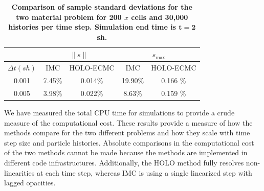 \documentclass{mc2013}
\renewcommand{\ss}{\ensuremath{\|s\|}}
\begin{document}
\begin{table}[H]
\centering
\caption{\label{twomat_var} \textbf{Comparison of sample standard deviations for the
    two material problem for 200 $x$ cells and 30,000 histories per time step.   Simulation end time is $\mathbf{t=2}$ sh.}}
\vspace{-0.1in}
\begin{tabular}{|c|cc|cc|}\cline{2-5}
    \multicolumn{1}{c|}{}       & \multicolumn{2}{|c|}{\ss} & \multicolumn{2}{|c|}{$s_{\max}$} \\ \hline
$\Delta t (sh)$   & IMC & HOLO-ECMC  &  IMC & HOLO-ECMC   \\ \hline
   0.001	      & 7.45\%  & 0.014\% &  19.90\%  & 0.166 \%            \\
   0.005          & 3.98\%  & 0.022\% &  8.63\%   & 0.159 \%     \\ \hline
\end{tabular}
\end{table}


We have measured the total CPU time for simulations to provide a crude measure of the
computational cost.  These results provide a measure of how the methods compare for
the two different problems and how they scale with
time step size and particle histories.  Absolute comparisons in the computational cost of the two
methods cannot be made because the methods are implemented
in different code infrastructures. Additionally, the HOLO method fully resolves
non-linearities at each time step, whereas IMC is using a single linearized step with
lagged opacities. 
\end{document}
